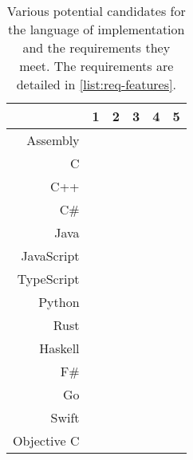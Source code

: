 \newcommand{\y}{\color{success-green}{\cmark}}
\newcommand{\n}{\color{fail-red}{\xmark}}

\begin{table}[H] 
    \centering
    \begin{tabular}{r|ccccc}
        \toprule
        & 1 & 2 & 3 & 4 & 5 \\
        \midrule
        Assembly    & \y & \n & \y & \y & \y \\
        C           & \y & \y & \y & \y & \y \\
        C++         & \y & \y & \y & \y & \y \\
        C\#         & \y & \y & \n & \y & \y \\
        Java        & \y & \y & \n & \n & \n \\
        JavaScript  & \y & \n & \n & \n & \n \\
        TypeScript  & \y & \y & \n & \n & \n \\
        Python      & \y & \n & \n & \n & \n \\
        Rust        & \y & \y & \y & \y & \y \\
        Haskell     & \y & \y & \n & \y & \y \\
        F\#         & \y & \y & \n & \y & \y \\
        Go          & \y & \y & \n & \n & \y \\
        Swift       & \n & \y & \n & \y & \y \\
        Objective C & \n & \y & \y & \y & \y \\
        \bottomrule
    \end{tabular}
    \caption{Various potential candidates for the language of implementation and the requirements they meet. The requirements are detailed in \autoref{list:req-features}.}
    \label{tbl:lang-reqs}
\end{table}


